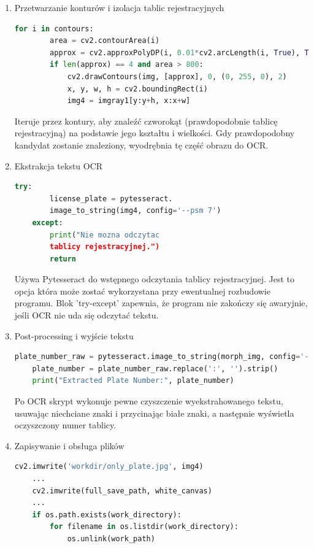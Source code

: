 \documentclass[12pt,a4paper,oneside]{article}
\theoremstyle{definition}
\numberwithin{equation}{section}
\begin{document}
\begin{enumerate}
\item Przetwarzanie konturów i izolacja tablic rejestracyjnych


\begin{lstlisting}[language=Python]
    for i in contours:
        area = cv2.contourArea(i)
        approx = cv2.approxPolyDP(i, 0.01*cv2.arcLength(i, True), True)
        if len(approx) == 4 and area > 800:
            cv2.drawContours(img, [approx], 0, (0, 255, 0), 2)
            x, y, w, h = cv2.boundingRect(i)
            img4 = imgray1[y:y+h, x:x+w]
\end{lstlisting}        

Iteruje przez kontury, aby znaleźć czworokąt (prawdopodobnie tablicę rejestracyjną) na podstawie jego kształtu i wielkości. Gdy prawdopodobny kandydat zostanie znaleziony, wyodrębnia tę część obrazu do OCR.

\item Ekstrakcja tekstu OCR


\begin{lstlisting}[language=Python]
    try:
        license_plate = pytesseract.
        image_to_string(img4, config='--psm 7')
    except:
        print("Nie mozna odczytac 
        tablicy rejestracyjnej.")
        return
\end{lstlisting} 



Używa Pytesseract do wstępnego odczytania tablicy rejestracyjnej. Jest to opcja która może zostać wykorzystana przy ewentualnej rozbudowie programu. Blok 'try-except' zapewnia, że program nie zakończy się awaryjnie, jeśli OCR nie uda się odczytać tekstu.

\item Post-processing i wyjście tekstu


\begin{lstlisting}[language=Python]
    plate_number_raw = pytesseract.image_to_string(morph_img, config='--psm 8 --oem 3')
    plate_number = plate_number_raw.replace(':', '').strip()
    print("Extracted Plate Number:", plate_number)
\end{lstlisting} 


Po OCR skrypt wykonuje pewne czyszczenie wyekstrahowanego tekstu, usuwając niechciane znaki i przycinając białe znaki, a następnie wyświetla oczyszczony numer tablicy.




\item Zapisywanie i obsługa plików

\begin{lstlisting}[language=Python]
    cv2.imwrite('workdir/only_plate.jpg', img4)
    ...
    cv2.imwrite(full_save_path, white_canvas)
    ...
    if os.path.exists(work_directory):
        for filename in os.listdir(work_directory):
            os.unlink(work_path)
\end{lstlisting} 



\end{enumerate}
\end{document}

